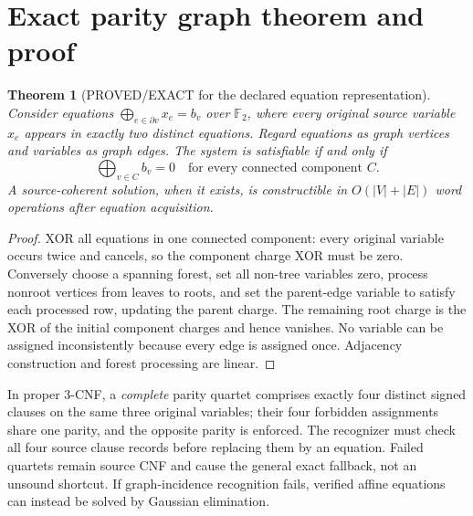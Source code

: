 \documentclass[11pt]{article}
\newtheorem{theorem}{Theorem}
\begin{document}
\section{Exact parity graph theorem and proof}
\begin{theorem}[PROVED/EXACT for the declared equation representation]
Consider equations $\bigoplus_{e\in\partial v}x_e=b_v$ over $\mathbb F_2$, where every original source variable $x_e$ appears in exactly two \emph{distinct} equations. Regard equations as graph vertices and variables as graph edges. The system is satisfiable if and only if
\[
\boxed{\bigoplus_{v\in C}b_v=0\quad\text{for every connected component }C.}
\]
A source-coherent solution, when it exists, is constructible in $O(|V|+|E|)$ word operations after equation acquisition.
\end{theorem}
\begin{proof}
XOR all equations in one connected component: every original variable occurs twice and cancels, so the component charge XOR must be zero. Conversely choose a spanning forest, set all non-tree variables zero, process nonroot vertices from leaves to roots, and set the parent-edge variable to satisfy each processed row, updating the parent charge. The remaining root charge is the XOR of the initial component charges and hence vanishes. No variable can be assigned inconsistently because every edge is assigned once. Adjacency construction and forest processing are linear.
\end{proof}
In proper 3-CNF, a \emph{complete} parity quartet comprises exactly four distinct signed clauses on the same three original variables; their four forbidden assignments share one parity, and the opposite parity is enforced. The recognizer must check all four source clause records before replacing them by an equation. Failed quartets remain source CNF and cause the general exact fallback, not an unsound shortcut. If graph-incidence recognition fails, verified affine equations can instead be solved by Gaussian elimination.
\end{document}
